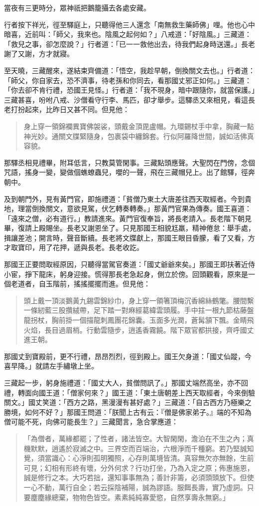 當夜有三更時分，眾神祇把鵝籠攝去各處安藏。

行者按下祥光，徑至驛庭上，只聽得他三人還念「南無救生藥師佛」哩。他也心中暗喜，近前叫：「師父，我來也。陰風之起何如？」八戒道：「好陰風。」三藏道：「救兒之事，卻怎麼說？」行者道：「已一一救他出去，待我們起身時送還。」長老謝了又謝，方才就寢。

至天曉，三藏醒來，遂結束齊備道：「悟空，我趁早朝，倒換關文去也。」行者道：「師父，你自家去，恐不濟事，待老孫和你同去，看那國丈邪正如何。」三藏道：「你去卻不肯行禮，恐國王見怪。」行者道：「我不現身，暗中跟隨你，就當保護。」三藏甚喜，吩咐八戒、沙僧看守行李、馬匹，卻才舉步。這驛丞又來相見，看這長老打扮起來，比昨日又甚不同。但見他：
\begin{quote}
身上穿一領錦襴異寶佛袈裟，頭戴金頂毘盧帽。九環錫杖手中拿，胸藏一點神光妙。通關文牒緊隨身，包裹袋中纏錦套。行似阿羅降世間，誠如活佛真容貌。
\end{quote}

那驛丞相見禮畢，附耳低言，只教莫管閑事。三藏點頭應聲。大聖閃在門傍，念個咒語，搖身一變，變做個蟭蟟蟲兒，嚶的一聲，飛在三藏帽兒上。出了館驛，徑奔朝中。

及到朝門外，見有黃門官，即施禮道：「貧僧乃東土大唐差往西天取經者。今到貴地，理當倒換關文，意欲見駕，伏乞轉奏轉奏。」那黃門官果為傳奏。國王喜道：「遠來之僧，必有道行。」教請進來。黃門官復奉旨，將長老請入。長老階下朝見畢，復請上殿賜坐。長老又謝恩坐了。只見那國王相貌尪羸，精神倦怠：舉手處，揖讓差池；開言時，聲音斷續。長老將文牒獻上，那國王眼目昏朦，看了又看，方才取寶印，用了花押，遞與長老。長老收訖。

那國王正要問取經原因，只聽得當駕官奏道：「國丈爺爺來矣。」那國王即扶著近侍小宦，掙下龍床，躬身迎接。慌得那長老急起身，側立於傍。回頭觀看，原來是一個老道者，自玉階前，搖搖擺擺而進。但見他：
\begin{quote}
頭上戴一頂淡鵝黃九錫雲錦紗巾，身上穿一領箸頂梅沉香綿絲鶴氅。腰間繫一條紉藍三股攢絨帶，足下踏一對麻經葛緯雲頭履。手中拄一根九節枯藤盤龍拐杖，胸前掛一個描龍刺鳳團花錦囊。玉面多光潤，蒼髯頷下飄。金睛飛火焰，長目過眉梢。行動雲隨步，逍遙香霧饒。階下眾官都拱接，齊呼國丈進王朝。
\end{quote}

那國丈到寶殿前，更不行禮，昂昂烈烈，徑到殿上。國王欠身道：「國丈仙蹤，今喜早降。」就請左手繡墩上坐。

三藏起一步，躬身施禮道：「國丈大人，貧僧問訊了。」那國丈端然高坐，亦不回禮，轉面向國王道：「僧家何來？」國王道：「東土唐朝差上西天取經者，今來倒驗關文。」國丈笑道：「西方之路，黑漫漫有甚好處？」三藏道：「自古西方乃極樂之勝境，如何不好？」那國王問道：「朕聞上古有云：『僧是佛家弟子。』端的不知為僧可能不死，向佛可能長生？」三藏聞言，急合掌應道：
\begin{quote}
「為僧者，萬緣都罷；了性者，諸法皆空。大智閑閑，澹泊在不生之內；真機默默，逍遙於寂滅之中。三界空而百端治，六根淨而千種窮。若乃堅誠知覺，須當識心：心淨則孤明獨照，心存則萬境皆清。真容無欠亦無餘，生前可見；幻相有形終有壞，分外何求？行功打坐，乃為入定之原；佈惠施恩，誠是修行之本。大巧若拙，還知事事無為；善計非籌，必須頭頭放下。但使一心不動，萬行自全；若云採陰補陽，誠為謬語。服餌長壽，實乃虛詞。只要塵塵緣總棄，物物色皆空。素素純純寡愛慾，自然享壽永無窮。」
\end{quote}

